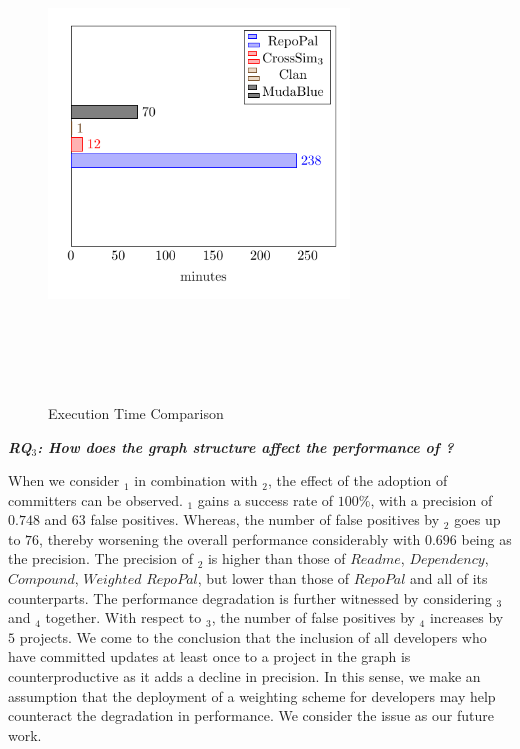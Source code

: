 \begin{figure}[!h]
\includegraphics[width=8cm,height=13cm,keepaspectratio]{images/ExecutionTime.pdf}
\centering
\caption{Execution Time Comparison}
\label{fig:ExecutionTime}
\end{figure}



\newcommand{\rqthird}{RQ$_3$: How does the graph structure affect the performance of \CrossSim?}\textit{\textbf{\rqthird}} 


When we consider \CrossSimA$_{1}$ in combination with \CrossSimA$_{2}$, the effect of the adoption of committers can be observed. \CrossSimA$_{1}$ gains a success rate of $100\%$, with a precision of $0.748$ and $63$ false positives. Whereas, the number of false positives by \CrossSimA$_{2}$ goes up to $76$, thereby worsening the overall performance considerably with $0.696$ being as the precision. The precision of \CrossSimA$_{2}$ is higher than those of $Readme$, $Dependency$, $Compound$, $Weighted$ $RepoPal$, but lower than those of $RepoPal$ and all of its \CrossSim counterparts. The performance degradation is further witnessed by considering \CrossSimA$_{3}$ and \CrossSimA$_{4}$ together. With respect to \CrossSimA$_{3}$, the number of false positives by \CrossSimA$_{4}$ increases by $5$ projects. We come to the conclusion that the inclusion of all developers who have committed updates at least once to a project in the graph is counterproductive as it adds a decline in precision. In this sense, we make an assumption that the deployment of a weighting scheme for developers may help counteract the degradation in performance. We consider the issue as our future work. 

